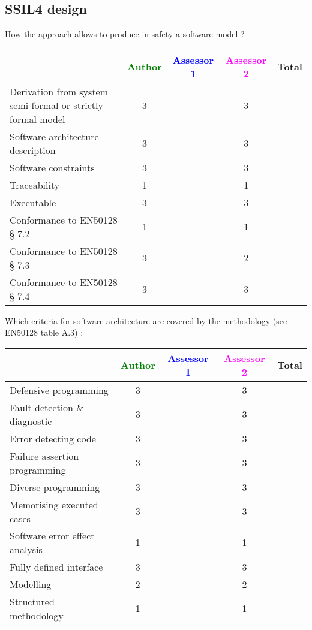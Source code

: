 \subsection{SSIL4 design}

How the approach allows to  produce in safety a software model ?

\begin{tabular}{|l | c | c | c | c|}
\hline
& \textcolor{green}{Author} & \textcolor{blue}{Assessor 1} & \textcolor{magenta}{Assessor 2} & Total \\
\hline
Derivation from system semi-formal or strictly formal model  & 3    & & 3    &  \\
\hline 
Software architecture description  & 3    & & 3    &  \\
\hline
Software constraints  & 3    & & 3    &  \\
\hline
Traceability  & 1    & & 1    &  \\
\hline
Executable  & 3    & & 3    &  \\
\hline
Conformance to EN50128 § 7.2  & 1    & & 1    &  \\
\hline
Conformance to EN50128 § 7.3  & 3    & & 2    &  \\
\hline
Conformance to EN50128 § 7.4  & 3    & & 3    &  \\
\hline
\end{tabular}

Which criteria for software architecture are covered by the methodology
(see EN50128 table A.3) :

\begin{tabular}{|l | c | c | c | c|}
\hline
& \textcolor{green}{Author} & \textcolor{blue}{Assessor 1} & \textcolor{magenta}{Assessor 2} & Total \\
\hline
Defensive programming  & 3    & & 3    &  \\
\hline 
Fault detection \& diagnostic  & 3    & & 3    &  \\
\hline
Error detecting code  & 3    & & 3    &  \\
\hline
Failure assertion programming & 3    & & 3    &  \\
\hline
Diverse programming & 3    & & 3    &  \\
\hline
Memorising executed cases & 3    & & 3    &  \\
\hline
Software error effect analysis & 1    & & 1    &  \\
\hline
Fully defined interface & 3    & & 3    &  \\
\hline
Modelling  & 2    & & 2   &  \\
\hline
Structured methodology & 1    & & 1    &  \\
\hline
\end{tabular}

